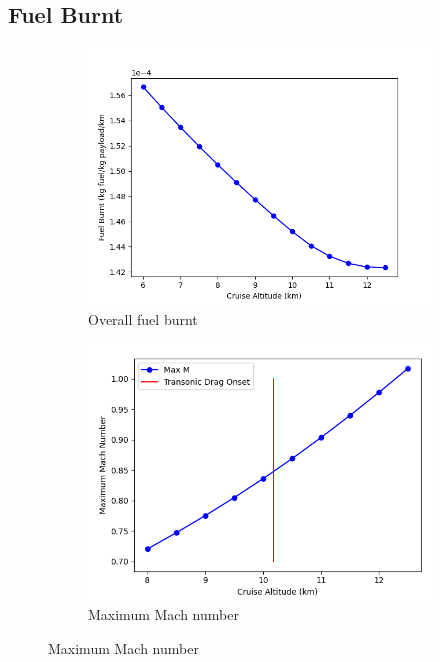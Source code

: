 \documentclass[12pt, a4paper]{article}
\begin{document}
\subsection{Fuel Burnt} \label{sec:fuel}
\captionsetup[figure]{belowskip=-1.5cm}
\begin{figure}[H]
	\begin{subfigure}[b]{0.5\textwidth}
		\centering
		\includegraphics[width=\textwidth]{../Plots/h fuel}
		\caption{Overall fuel burnt}
		\label{fig:hfuel}
	\end{subfigure}
	\hfill
	\begin{subfigure}[b]{0.5\textwidth}
		\centering
		\includegraphics[width=\textwidth]{../Plots/h max m}
		\caption{Maximum Mach number}
		\label{fig:hmach}
	\end{subfigure}
	\label{hfuel}
	\hfill
\end{figure}
\renewcommand{\thesubfigure}{\alph{subfigure}}
\renewcommand{\subfigurename}{}
\captionsetup[figure]{belowskip=-0.5cm}
\end{document}
